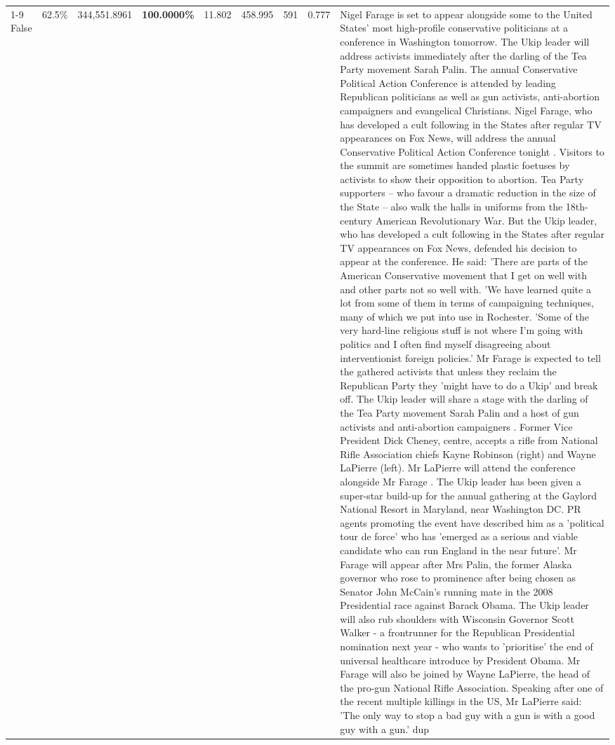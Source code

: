 \begin{table}[H]
\begin{tabular}{lllrlllll}
\cline{1-9}
False & 62.5\% & 344,551.8961 & \bfseries \color{red} 100.0000\% & 11.802 & 458.995 & 591 & 0.777 & Nigel Farage is set to appear alongside some to the United States' most high-profile conservative politicians at a conference in Washington tomorrow. The Ukip leader will address activists immediately after the darling of the Tea Party movement Sarah Palin. The annual Conservative Political Action Conference is attended by leading Republican politicians as well as gun activists, anti-abortion campaigners and evangelical Christians. Nigel Farage, who has developed a cult following in the States after regular TV appearances on Fox News, will address the annual Conservative Political Action Conference tonight . Visitors to the summit are sometimes handed plastic foetuses by activists to show their opposition to abortion. Tea Party supporters – who favour a dramatic reduction in the size of the State – also walk the halls in uniforms from the 18th-century American Revolutionary War. But the Ukip leader, who has developed a cult following in the States after regular TV appearances on Fox News, defended his decision to appear at the conference. He said: 'There are parts of the American Conservative movement that I get on well with and other parts not so well with. 'We have learned quite a lot from some of them in terms of campaigning techniques, many of which we put into use in Rochester. 'Some of the very hard-line religious stuff is not where I'm going with politics and I often find myself disagreeing about interventionist foreign policies.' Mr Farage is expected to tell the gathered activists that unless they reclaim the Republican Party they 'might have to do a Ukip' and break off. The Ukip leader will share a stage with the darling of the Tea Party movement Sarah Palin and a host of gun activists and anti-abortion campaigners . Former Vice President Dick Cheney, centre, accepts a rifle from National Rifle Association chiefs Kayne Robinson (right) and Wayne LaPierre (left). Mr LaPierre will attend the conference alongside Mr Farage . The Ukip leader has been given a super-star build-up for the annual gathering at the Gaylord National Resort in Maryland, near Washington DC. PR agents promoting the event have described him as a 'political tour de force' who has 'emerged as a serious and viable candidate who can run England in the near future'. Mr Farage will appear after Mrs Palin, the former Alaska governor who rose to prominence after being chosen as Senator John McCain's running mate in the 2008 Presidential race against Barack Obama. The Ukip leader will also rub shoulders with Wisconsin Governor Scott Walker - a frontrunner for the Republican Presidential nomination next year - who wants to 'prioritise' the end of universal healthcare introduce by President Obama. Mr Farage will also be joined by Wayne LaPierre, the head of the pro-gun National Rifle Association. Speaking after one of the recent multiple killings in the US, Mr LaPierre said: 'The only way to stop a bad guy with a gun is with a good guy with a gun.' dup \\

\end{tabular}
\end{table}
